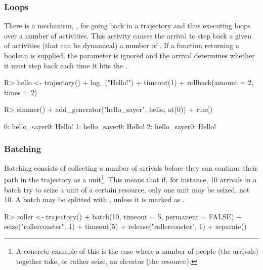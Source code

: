\documentclass[
  nojss]{jss}
\begin{document}
\hypertarget{loops}{%
\subsubsection{Loops}\label{loops}}

There is a mechanism, , for going back in a trajectory
and thus executing loops over a number of activities. This activity
causes the arrival to step back a given  of activities
(that can be dynamical) a number of . If a 
function returning a boolean is supplied, the  parameter is
ignored and the arrival determines whether it must step back each time
it hits the .

\begin{CodeChunk}
\begin{CodeInput}
R> hello <- trajectory() %
+   log_("Hello!") %
+   timeout(1) %
+   rollback(amount = 2, times = 2)
\end{CodeInput}
\end{CodeChunk}

\begin{CodeChunk}
\begin{CodeInput}
R> simmer() %
+   add_generator("hello_sayer", hello, at(0)) %
+   run() %
\end{CodeInput}
\begin{CodeOutput}
0: hello_sayer0: Hello!
1: hello_sayer0: Hello!
2: hello_sayer0: Hello!
\end{CodeOutput}
\end{CodeChunk}

\hypertarget{batching}{%
\subsubsection{Batching}\label{batching}}

Batching consists of collecting a number of arrivals before they can
continue their path in the trajectory as a unit\footnote{A concrete
  example of this is the case where a number of people (the arrivals)
  together take, or rather seize, an elevator (the resource).}. This
means that if, for instance, 10 arrivals in a batch try to seize a unit
of a certain resource, only one unit may be seized, not 10. A batch may
be splitted with , unless it is marked as
.

\begin{CodeChunk}
\begin{CodeInput}
R> roller <- trajectory() %
+   batch(10, timeout = 5, permanent = FALSE) %
+   seize("rollercoaster", 1) %
+   timeout(5) %
+   release("rollercoaster", 1) %
+   separate()
\end{CodeInput}
\end{CodeChunk}
\end{document}
